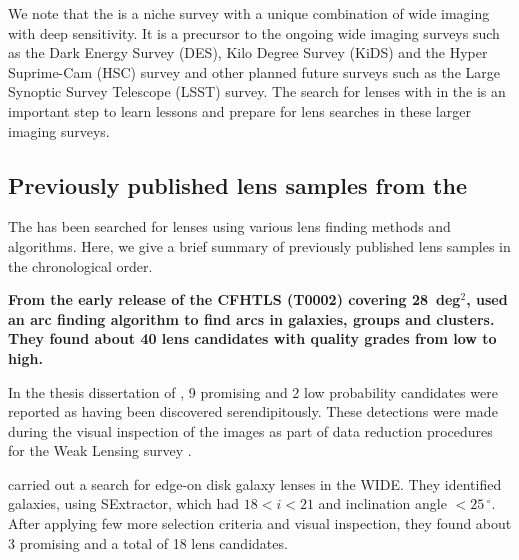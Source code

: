 \documentclass[useAMS,usenatbib,a4paper]{mn2e}
\begin{document}
We note that the \cfhtls is a niche survey with a unique combination of wide
imaging with deep sensitivity. It is a precursor to the ongoing wide imaging
surveys such as the Dark Energy Survey (DES), Kilo Degree Survey (KiDS) and the
Hyper Suprime-Cam (HSC) survey and other planned future surveys such as the
Large Synoptic Survey Telescope (LSST) survey.  The search for lenses with \sw
in the \cfhtls is an important step to learn lessons and prepare for lens
searches in these larger imaging surveys.



\subsection{Previously published lens samples from the \cfhtls}
\label{sec:data:kls}

The \cfhtls has been searched for lenses using various lens finding
methods and algorithms. Here, we give a brief summary of previously published lens
samples in the chronological order.

{\bf From the early release of the CFHTLS (T0002) covering 28~deg$^2$,
\citet{Cabanac2007} used an arc finding algorithm \citep{Alard2006} to
find arcs in galaxies, groups and clusters. They found about 40 lens
candidates with quality grades from low to high.}

In the thesis dissertation of \citet{Thanjavur2009}, 9 promising and 2
low probability candidates were reported as having been discovered
serendipitously. These detections were made during the visual
inspection of the \cfhtls images as part of data reduction procedures
for the Weak Lensing survey \citep{Benjamin2007}.

\citet{Sygnet2010} carried out a search for edge-on disk galaxy lenses in the
\cfhtls WIDE. They identified galaxies, using {\sc SExtractor}, which
had $18<i<21$ and inclination angle $<25\,^{\circ}$. After applying few more
selection criteria and visual inspection, they found about 3 promising
and a total of 18 lens candidates.
\end{document}
